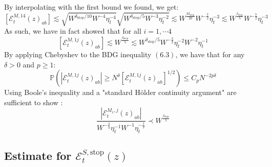 \documentclass[11pt]{article}
\newcommand{\E}{\mathcal{E}}
\newcommand{\sto}{\text{stop}}
\begin{document}
\noindent By interpolating with the first bound we found, we get: 
$$\left[\E_t^{M, 14}(z)_{ab}\right] \lesssim \sqrt{ W^{\delta_\sto/10}W^{-4}\eta_t^{-4}}\sqrt{W^{\delta_\sto/5}W^{-3}\eta_t^{-2}}\lesssim W^{\frac{3\delta_\sto}{20}}W^{-\frac{7}{2}}\eta_t^{-3}\lesssim W^{\frac{\delta_\sto}{5}}W^{-\frac{7}{2}}\eta_t^{-3}$$
As such, we have in fact showed that for all $i=1, \cdots 4$ $$[\E_t^{M, 1j}(z)_{ab}]\lesssim W^{\frac{\delta_\sto}{5}}\lesssim W^{\delta_\sto/5}W^{-\frac{3}{2}}\eta_t^{-2}W^{-2}\eta_t^{-1}$$
By applying Chebyshev to the BDG inequality $(6.3)$, we have that for any $\delta>0$ and $p\geq 1$: 
\begin{equation*}\mathbb{P}\left(\left\vert \E_t^{M, 1j}(z)_{ab}\right\vert\geq N^\delta [\E_t^{M, 1j}(z)_{ab}]^{1/2}\right)\leq C_p N^{-2p\delta}\tag{6.5}\end{equation*}
Using Boole's inequality and a "standard Hölder continuity argument"  are sufficient to show \cite{bandSDE}:
$$\frac{\left\vert \E_t^{M_1, j}(z)_{ab}\right\vert}{W^{-\frac{3}{4}}\eta_t^{-1}W^{-1}\eta_t^{-\frac{1}{2}}}\prec W^{\frac{\delta_\sto}{5}}$$




\subsection{Estimate for $\E_t^{S, \text{stop}}(z)$}
\end{document}
